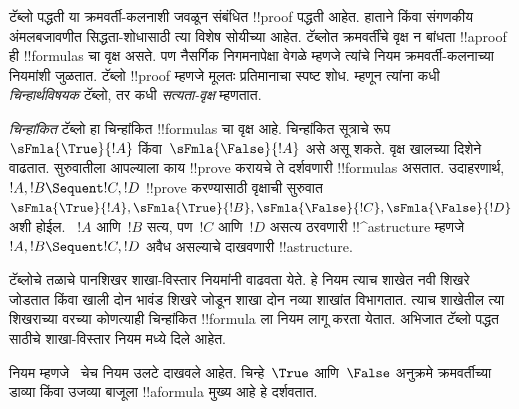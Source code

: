 \documentclass[../../../include/open-logic-section]{subfiles}
\begin{document}


टॅब्लो पद्धती या क्रमवर्ती-कलनाशी जवळून
संबंधित !!{proof} पद्धती आहेत. हाताने किंवा
संगणकीय अंमलबजावणीत सिद्धता-शोधासाठी त्या विशेष
सोयीच्या आहेत. टॅब्लोत क्रमवर्तींचे वृक्ष न बांधता
!!a{proof} ही !!{formula}s चा वृक्ष असते.
पण नैसर्गिक निगमनापेक्षा वेगळे म्हणजे त्यांचे नियम
क्रमवर्ती-कलनाच्या नियमांशी जुळतात. टॅब्लो
!!{proof} म्हणजे मूलतः प्रतिमानाचा स्पष्ट शोध.
म्हणून त्यांना कधी \emph{चिन्हार्थविषयक} टॅब्लो,
तर कधी \emph{सत्यता-वृक्ष} म्हणतात.

\emph{चिन्हांकित} टॅब्लो हा चिन्हांकित
!!{formula}s चा वृक्ष आहे. चिन्हांकित सूत्राचे रूप
$\sFmla{\True}{!A}$ किंवा~$\sFmla{\False}{!A}$
असे असू शकते. वृक्ष खालच्या दिशेने वाढतात.
सुरुवातीला आपल्याला काय !!{prove} करायचे ते
दर्शवणारी !!{formula}s असतात. उदाहरणार्थ,
$!A, !B \Sequent !C, !D$ !!{prove} करण्यासाठी
वृक्षाची सुरुवात
$\sFmla{\True}{!A}, \sFmla{\True}{!B},
\sFmla{\False}{!C}, \sFmla{\False}{!D}$ अशी
होईल. ~$!A$ आणि~$!B$ सत्य, पण~$!C$ आणि~$!D$
असत्य ठरवणारी !!^a{structure} म्हणजे
$!A, !B \Sequent !C, !D$ अवैध असल्याचे
दाखवणारी !!a{structure}.

टॅब्लोचे तळाचे पानशिखर शाखा-विस्तार
नियमांनी वाढवता येते. हे नियम त्याच शाखेत नवी
शिखरे जोडतात किंवा खाली दोन भावंड शिखरे जोडून
शाखा दोन नव्या शाखांत विभागतात. त्याच शाखेतील
त्या शिखराच्या वरच्या कोणत्याही चिन्हांकित
!!{formula} ला नियम लागू करता येतात. अभिजात
टॅब्लो पद्धत~ साठीचे शाखा-विस्तार नियम
 मध्ये दिले आहेत.



नियम म्हणजे~ चेच नियम उलटे
दाखवले आहेत. चिन्हे~$\True$ आणि~$\False$
अनुक्रमे क्रमवर्तीच्या डाव्या किंवा उजव्या बाजूला
!!a{formula} मुख्य आहे हे दर्शवतात.
\end{document}
